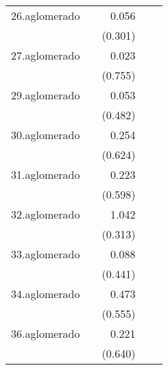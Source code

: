 {\begin{longtable}{l*{4}{D{.}{.}{-1}}}
\addlinespace
26.aglomerado&                     &       0.056         &                     &                     \\
            &                     &     (0.301)         &                     &                     \\
\addlinespace
27.aglomerado&                     &       0.023         &                     &                     \\
            &                     &     (0.755)         &                     &                     \\
\addlinespace
29.aglomerado&                     &       0.053         &                     &                     \\
            &                     &     (0.482)         &                     &                     \\
\addlinespace
30.aglomerado&                     &       0.254         &                     &                     \\
            &                     &     (0.624)         &                     &                     \\
\addlinespace
31.aglomerado&                     &       0.223         &                     &                     \\
            &                     &     (0.598)         &                     &                     \\
\addlinespace
32.aglomerado&                     &       1.042\sym{***}&                     &                     \\
            &                     &     (0.313)         &                     &                     \\
\addlinespace
33.aglomerado&                     &       0.088         &                     &                     \\
            &                     &     (0.441)         &                     &                     \\
\addlinespace
34.aglomerado&                     &       0.473         &                     &                     \\
            &                     &     (0.555)         &                     &                     \\
\addlinespace
36.aglomerado&                     &       0.221         &                     &                     \\
            &                     &     (0.640)         &                     &                     \\

\end{longtable}}
